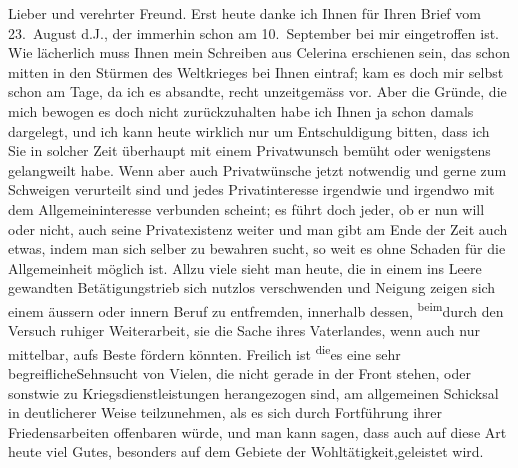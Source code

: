 \pstart\center{}Lieber und verehrter Freund.\pend\vspace{0.5em}
\pstart
           Erst heute danke ich Ihnen für Ihren Brief vom 23. August d.J., der
               immerhin schon am 10. September bei mir eingetroffen ist. Wie lächerlich
               muss Ihnen mein Schreiben aus Celerina
               erschienen sein, das schon mitten in den Stürmen des Weltkrieges bei Ihnen eintraf;
               kam es doch mir selbst schon am Tage, da ich es absandte, recht unzeitgemäss vor.
               Aber die Gründe, die mich bewogen es doch nicht zurückzuhalten habe ich Ihnen ja  schon damals dargelegt\introOben{},\introOben{}
               und ich kann heute wirklich nur um Entschuldigung bitten, dass ich Sie in solcher
               Zeit überhaupt mit einem Privatwunsch bemüht oder wenigstens gelangweilt habe. Wenn
               aber auch Privatwünsche jetzt notwendig und gerne zum Schweigen verurteilt sind und
               jedes Privatinteresse irgendwie und irgendwo mit dem Allgemeininteresse verbunden
               scheint; es führt {\pb}doch jeder, ob er nun will oder
               nicht, auch seine Privatexistenz weiter und man gibt am Ende der Zeit auch etwas,
               indem man sich selber zu bewahren sucht, so weit es ohne Schaden für die
               Allgemeinheit möglich ist. Allzu viele sieht man heute, die in einem ins Leere
               gewandten Betätigungstrieb sich nutzlos verschwenden und Neigung zeigen sich einem
               äussern oder innern Beruf zu entfremden, innerhalb dessen, \substVorne{}\textsuperscript{beim}\substDazwischen{}durch den\substHinten{} Versuch ruhiger Weiterarbeit, sie die Sache ihres Vaterlandes, wenn auch nur
               mittelbar, aufs Beste fördern könnten. Freilich ist \substVorne{}\textsuperscript{die}\substDazwischen{}es eine sehr
                     begreifliche\substHinten{}{ }Sehnsucht von Vielen, die nicht gerade in der Front
               stehen, oder sonstwie zu Kriegsdienstleistungen herangezogen sind, am allgemeinen
               Schicksal in deutlicherer Weise teilzunehmen, als es sich durch Fortführung ihrer
               Friedensarbeiten offenbaren würde, und man kann sagen, dass auch auf diese Art heute
               viel Gutes, besonders auf dem Gebiete der Wohltätigkeit,geleistet wird.\pend
           

